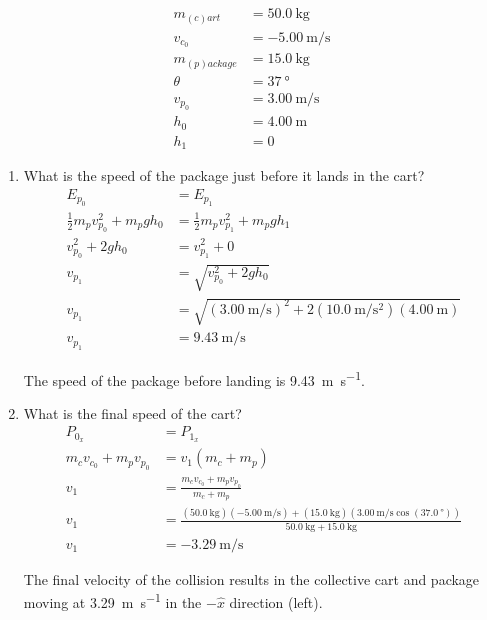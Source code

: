 \documentclass{article}
\begin{document}
\begin{align*}
	m_{(c)art} & = \SI{50.0}{\kilogram} \\
	v_{c_0} & = \SI{-5.00}{\meter \per \second} \\
	m_{(p)ackage} & = \SI{15.0}{\kilogram} \\
	\theta & = \SI{37}{\degree} \\
	v_{p_0} & = \SI{3.00}{\meter \per \second} \\
	h_0 & = \SI{4.00}{\meter} \\
	h_1 & = 0
\end{align*}
\begin{enumerate}[label = \textbf{(\alph*)}]
	\item What is the speed of the package just before it lands in the cart?
		\begin{align*}
			E_{p_0} & = E_{p_1} \\
			\frac{1}{2}m_pv_{p_0}^2 + m_pgh_0 & = \frac{1}{2}m_pv_{p_1}^2 + m_pgh_1 \\
			v_{p_0}^2 + 2gh_0 & = v_{p_1}^2 + 0 \\
			v_{p_1} & = \sqrt{v_{p_0}^2 + 2gh_0} \\
			v_{p_1} & = \sqrt{(\SI{3.00}{\meter \per \second})^2 + 2(\SI{10.0}{\meter \per \second \squared})(\SI{4.00}{\meter})} \\
			v_{p_1} & = \SI{9.43}{\meter \per \second}
		\end{align*}
		\begin{mdframed}
			The speed of the package before landing is \SI{9.43}{\meter \per \second}.
		\end{mdframed}
	\item What is the final speed of the cart?
		\begin{align*}
			P_{0_x} & = P_{1_x} \\
			m_cv_{c_0} + m_pv_{p_0} & = v_1(m_c + m_p) \\
			v_1 & = \frac{ m_cv_{c_0} + m_pv_{p_0} }{ m_c + m_p } \\
			v_1 & = \frac{ (\SI{50.0}{\kilogram})(\SI{-5.00}{\meter \per \second}) + (\SI{15.0}{\kilogram})(\SI{3.00}{\meter \per \second}\cos(\SI{37.0}{\degree})) }{ \SI{50.0}{\kilogram} + \SI{15.0}{\kilogram} } \\
			v_1 & = \SI{-3.29}{\meter \per \second}
		\end{align*}
		\begin{mdframed}
			The final velocity of the collision results in the collective cart and package moving at \SI{3.29}{\meter \per \second} in the $ -\hat{x} $ direction (left).
		\end{mdframed}
\end{enumerate}
\end{document}
